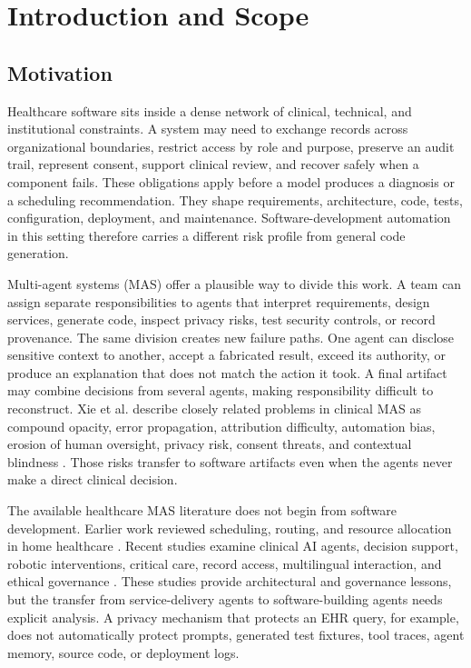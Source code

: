 \documentclass[11pt,a4paper]{article}
\begin{document}
\clearpage
\tableofcontents
\clearpage

\section{Introduction and Scope}

\subsection{Motivation}

Healthcare software sits inside a dense network of clinical, technical, and institutional constraints. A system may need to exchange records across organizational boundaries, restrict access by role and purpose, preserve an audit trail, represent consent, support clinical review, and recover safely when a component fails. These obligations apply before a model produces a diagnosis or a scheduling recommendation. They shape requirements, architecture, code, tests, configuration, deployment, and maintenance. Software-development automation in this setting therefore carries a different risk profile from general code generation.

Multi-agent systems (MAS) offer a plausible way to divide this work. A team can assign separate responsibilities to agents that interpret requirements, design services, generate code, inspect privacy risks, test security controls, or record provenance. The same division creates new failure paths. One agent can disclose sensitive context to another, accept a fabricated result, exceed its authority, or produce an explanation that does not match the action it took. A final artifact may combine decisions from several agents, making responsibility difficult to reconstruct. Xie et al. describe closely related problems in clinical MAS as compound opacity, error propagation, attribution difficulty, automation bias, erosion of human oversight, privacy risk, consent threats, and contextual blindness \cite[pp.~5--12]{xie2026ethical}. Those risks transfer to software artifacts even when the agents never make a direct clinical decision.

The available healthcare MAS literature does not begin from software development. Earlier work reviewed scheduling, routing, and resource allocation in home healthcare \cite{becker2018survey}. Recent studies examine clinical AI agents, decision support, robotic interventions, critical care, record access, multilingual interaction, and ethical governance \cite{gorenshtein2025clinical,ode2025evidence,demaio2025privacy,shehab2025agentic}. These studies provide architectural and governance lessons, but the transfer from service-delivery agents to software-building agents needs explicit analysis. A privacy mechanism that protects an EHR query, for example, does not automatically protect prompts, generated test fixtures, tool traces, agent memory, source code, or deployment logs.
\end{document}
